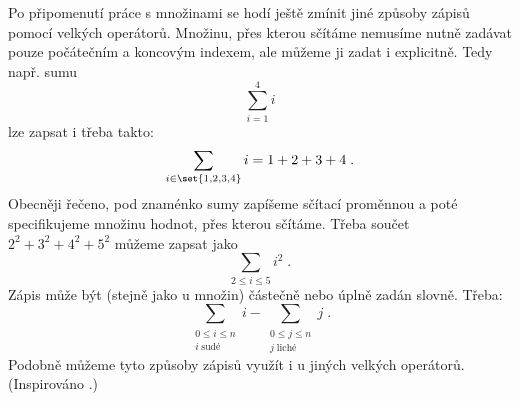 Po připomenutí práce s množinami se hodí ještě zmínit jiné způsoby zápisů pomocí velkých operátorů. Množinu, přes kterou sčítáme nemusíme nutně zadávat pouze počátečním a koncovým indexem, ale můžeme ji zadat i explicitně. Tedy např. sumu
\begin{equation*}
    \sum_{i=1}^{4}{i}
\end{equation*}
lze zapsat i třeba takto:
\begin{equation*}
    \sum_{i \in \set{1,2,3,4}}{i}=1+2+3+4\; .
\end{equation*}
Obecněji řečeno, pod znaménko sumy zapíšeme sčítací proměnnou a poté specifikujeme množinu hodnot, přes kterou sčítáme. Třeba součet $2^2+3^2+4^2+5^2$ můžeme zapsat jako
\begin{equation*}
    \sum_{2 \leq i \leq 5}{i^2}\; .
\end{equation*}
Zápis může být (stejně jako u množin) částečně nebo úplně zadán slovně. Třeba:
\begin{equation*}
    \sum_{\substack{0 \leq i \leq n\\ i\;\text{sudé}}}{i}-\sum_{\substack{0 \leq j \leq n\\ j\;\text{liché}}}{j}\; .
\end{equation*}
Podobně můžeme tyto způsoby zápisů využít i u jiných velkých operátorů. (Inspirováno \cite{MatousekNesetril2009}.)